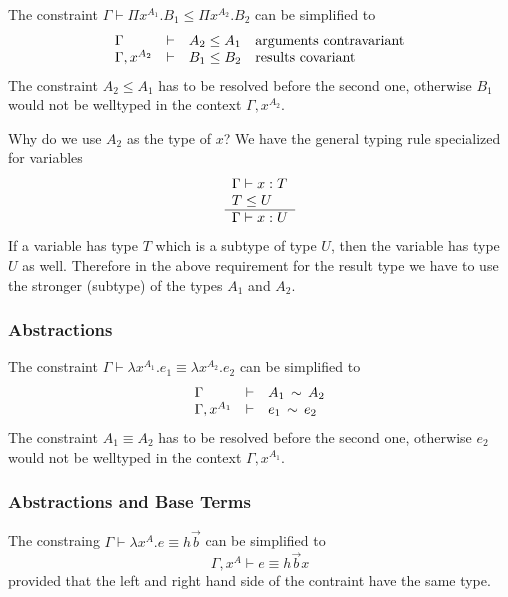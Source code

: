 The constraint $\Gamma \vdash \Pi x^{A_1}. B_1 \le \Pi x^{A_2}. B_2$ can be
simplified to
$$
    \begin{array}{lllll} 
        \Gamma          & \vdash & A_2 \le A_1
        &\text{arguments contravariant}
        \\
        \Gamma, x^{A_2} & \vdash & B_1 \le B_2
        &\text{results covariant}
     \end{array}
$$
%
The constraint $A_2 \le A_1$ has to be resolved before the second one,
otherwise $B_1$ would not be welltyped in the context $\Gamma, x^{A_2}$.

Why do we use $A_2$ as the type of $x$? We have the general typing rule
specialized for variables
$$
    \begin{array}{l} 
        \Gamma \vdash x : T
        \\
        T \le U
     \\ \hline 
        \Gamma \vdash x: U
     \end{array}
$$
If a variable has type $T$ which is a subtype of type $U$, then the variable has
type $U$ as well. Therefore in the above requirement for the result type we have
to use the stronger (subtype) of the types $A_1$ and $A_2$.




\subsubsection{Abstractions}

The constraint $\Gamma \vdash \lambda x^{A_1}. e_1 \equiv \lambda x^{A_2}. e_2$
can be simplified to
$$
    \begin{array}{lllll} 
        \Gamma          & \vdash & A_1 \,\sim\, A_2
        \\
        \Gamma, x^{A_1} & \vdash & e_1 \,\sim\, e_2
     \end{array}
$$
%
The constraint $A_1 \equiv A_2$ has to be resolved before the second one,
otherwise $e_2$ would not be welltyped in the context $\Gamma, x^{A_1}$.




\subsubsection{Abstractions and Base Terms}

The constraing $\Gamma \vdash \lambda x^A.e \equiv h \vec b$ can be simplified
to
$$
    \Gamma, x^A \vdash e \equiv h \vec b x
$$
provided that the left and right hand side of the contraint have the same type.
